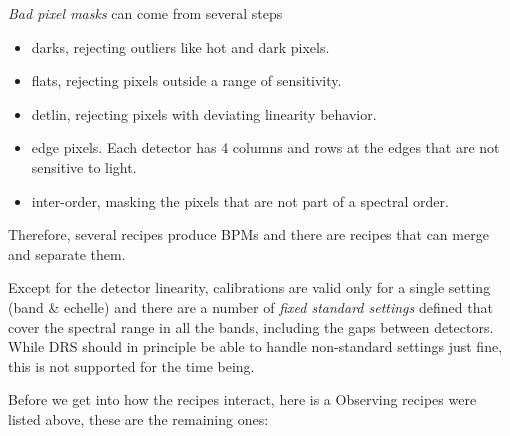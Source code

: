 \emph{Bad pixel masks} can come from several steps
\begin{itemize}
    \item darks, rejecting outliers like hot and dark pixels.
    \item flats, rejecting pixels outside a range of sensitivity.
    \item detlin, rejecting pixels with deviating linearity behavior.
    \item edge pixels. Each detector has 4 columns and rows at the edges that
        are not sensitive to light.
    \item inter-order, masking the pixels that are not part of a spectral order.
\end{itemize}

Therefore, several recipes produce BPMs and there are recipes that can merge
and separate them.

Except for the detector linearity, calibrations are valid only for a
single setting (band \& echelle) and there are a number of \textit{fixed
standard settings} defined that cover the spectral range in all the bands,
including the gaps between detectors. While DRS should in principle be able to
handle non-standard settings just fine, this is not supported for the time
being.

Before we get into how the recipes interact, here is a
Observing recipes were listed above, these are the remaining ones:

